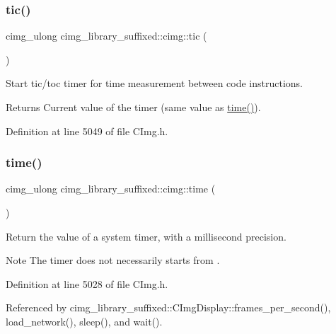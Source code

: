 \subsubsection{\texorpdfstring{tic()}{tic()}}
{\footnotesize\ttfamily cimg\+\_\+ulong cimg\+\_\+library\+\_\+suffixed\+::cimg\+::tic (\begin{DoxyParamCaption}{ }\end{DoxyParamCaption})\hspace{0.3cm}{\ttfamily [inline]}}



Start tic/toc timer for time measurement between code instructions. 

\begin{DoxyReturn}{Returns}
Current value of the timer (same value as \hyperlink{namespacecimg__library__suffixed_1_1cimg_a71a3c7b37befc7a4313dfcdd80271bce}{time()}). 
\end{DoxyReturn}


Definition at line 5049 of file C\+Img.\+h.

\mbox{\label{namespacecimg__library__suffixed_1_1cimg_a71a3c7b37befc7a4313dfcdd80271bce}} 
\subsubsection{\texorpdfstring{time()}{time()}}
{\footnotesize\ttfamily cimg\+\_\+ulong cimg\+\_\+library\+\_\+suffixed\+::cimg\+::time (\begin{DoxyParamCaption}{ }\end{DoxyParamCaption})\hspace{0.3cm}{\ttfamily [inline]}}



Return the value of a system timer, with a millisecond precision. 

\begin{DoxyNote}{Note}
The timer does not necessarily starts from {}. 
\end{DoxyNote}


Definition at line 5028 of file C\+Img.\+h.



Referenced by cimg\+\_\+library\+\_\+suffixed\+::\+C\+Img\+Display\+::frames\+\_\+per\+\_\+second(), load\+\_\+network(), sleep(), and wait().

